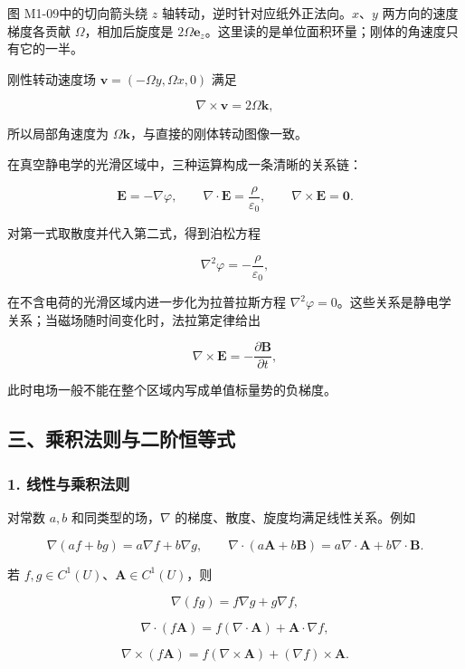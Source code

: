 图 M1-09中的切向箭头绕 \(z\) 轴转动，逆时针对应纸外正法向。\(x\)、\(y\)
两方向的速度梯度各贡献 \(\Omega\)，相加后旋度是
\(2\Omega\mathbf e_z\)。这里读的是单位面积环量；刚体的角速度只有它的一半。

刚性转动速度场 \(\mathbf v=(-\Omega y,\Omega x,0)\) 满足

\[
\nabla\times\mathbf v=2\Omega\mathbf k,
\]

所以局部角速度为 \(\Omega\mathbf k\)，与直接的刚体转动图像一致。

在真空静电学的光滑区域中，三种运算构成一条清晰的关系链：

\[
\mathbf E=-\nabla\varphi,\qquad
\nabla\cdot\mathbf E=\frac{\rho}{\varepsilon_0},\qquad
\nabla\times\mathbf E=\mathbf0.
\]

对第一式取散度并代入第二式，得到泊松方程

\[
\boxed{\nabla^2\varphi=-\frac{\rho}{\varepsilon_0}},
\]

在不含电荷的光滑区域内进一步化为拉普拉斯方程
\(\nabla^2\varphi=0\)。这些关系是静电学关系；当磁场随时间变化时，法拉第定律给出

\[
\nabla\times\mathbf E=-\frac{\partial\mathbf B}{\partial t},
\]

此时电场一般不能在整个区域内写成单值标量势的负梯度。

\subsection{三、乘积法则与二阶恒等式}\label{m1:ux4e09ux4e58ux79efux6cd5ux5219ux4e0eux4e8cux9636ux6052ux7b49ux5f0f}

\subsubsection{1.
线性与乘积法则}\label{m1:ux7ebfux6027ux4e0eux4e58ux79efux6cd5ux5219}

对常数 \(a,b\) 和同类型的场，\(\nabla\)
的梯度、散度、旋度均满足线性关系。例如

\[
\nabla(af+bg)=a\nabla f+b\nabla g,
\qquad
\nabla\cdot(a\mathbf A+b\mathbf B)
=a\nabla\cdot\mathbf A+b\nabla\cdot\mathbf B.
\]

若 \(f,g\in C^1(U)\)、\(\mathbf A\in C^1(U)\)，则

\[
\boxed{\nabla(fg)=f\nabla g+g\nabla f},
\]

\[
\boxed{\nabla\cdot(f\mathbf A)
=f(\nabla\cdot\mathbf A)+\mathbf A\cdot\nabla f},
\]

\[
\boxed{\nabla\times(f\mathbf A)
=f(\nabla\times\mathbf A)+(\nabla f)\times\mathbf A}.
\]

